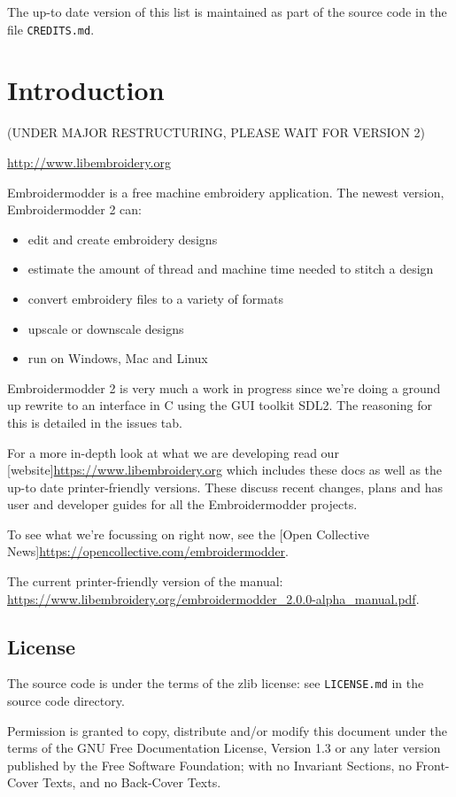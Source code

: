 \documentclass{report}
\begin{document}
The up-to date version of this list is maintained as part of the source code in the file \texttt{CREDITS.md}.

\chapter{Introduction}

(UNDER MAJOR RESTRUCTURING, PLEASE WAIT FOR VERSION 2)

\url{http://www.libembroidery.org}

Embroidermodder is a free machine embroidery application.
The newest version, Embroidermodder 2 can:

\begin{itemize}
\item edit and create embroidery designs
\item estimate the amount of thread and machine time needed to stitch a design
\item convert embroidery files to a variety of formats
\item upscale or downscale designs
\item run on Windows, Mac and Linux
\end{itemize}

Embroidermodder 2 is very much a work in progress since we're doing a ground
up rewrite to an interface in C using the GUI toolkit SDL2.
The reasoning for this is detailed in the issues tab.

For a more in-depth look at what we are developing read
our [website]\url{https://www.libembroidery.org} which includes these docs as well as the up-to date printer-friendly versions.
These discuss recent changes, plans and has user and developer guides for all the Embroidermodder projects.

To see what we're focussing on right now, see the [Open Collective News]\url{https://opencollective.com/embroidermodder}.

The current printer-friendly version of the manual: \url{https://www.libembroidery.org/embroidermodder_2.0.0-alpha_manual.pdf}.

\section{License}

The source code is under the terms of the zlib license: see \texttt{LICENSE.md} in the source code directory.

Permission is granted to copy, distribute and/or modify this document
under the terms of the GNU Free Documentation License, Version 1.3
or any later version published by the Free Software Foundation;
with no Invariant Sections, no Front-Cover Texts, and no Back-Cover Texts.
\end{document}
